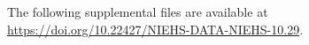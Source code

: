 The following supplemental files are available at \url{https://doi.org/10.22427/NIEHS-DATA-NIEHS-10.29}.
